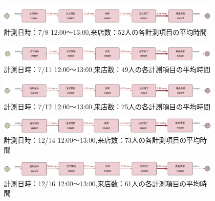 \documentclass{jsarticle}
\begin{document}
\begin{figure}[H]
  \centering
  \includegraphics[width=15cm]{708.png}
  \caption{計測日時：7/8 12:00〜13:00,来店数：52人の各計測項目の平均時間}
  \label{fig:708}
\end{figure}

\begin{figure}[H]
  \centering
  \includegraphics[width=15cm]{711.png}
  \caption{計測日時：7/11 12:00〜13:00,来店数：49人の各計測項目の平均時間}
  \label{fig:711}
\end{figure}

\begin{figure}[H]
  \centering
  \includegraphics[width=15cm]{712.png}
  \caption{計測日時：7/12 12:00〜13:00,来店数：75人の各計測項目の平均時間}
  \label{fig:712}
\end{figure}

\begin{figure}[H]
  \centering
  \includegraphics[width=15cm]{1214.png}
  \caption{計測日時：12/14 12:00〜13:00,来店数：73人の各計測項目の平均時間}
  \label{fig:1214}
\end{figure}

\begin{figure}[H]
  \centering
  \includegraphics[width=15cm]{1216.png}
  \caption{計測日時：12/16 12:00〜13:00,来店数：61人の各計測項目の平均時間}
  \label{fig:1216}
\end{figure}
\end{document}
